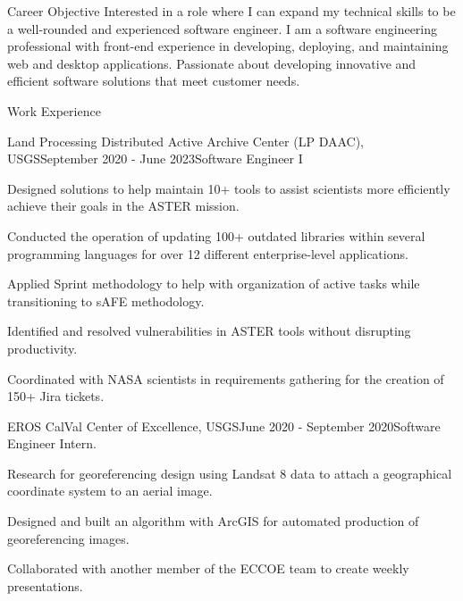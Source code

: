 \documentclass[11pt, a4paper]{resume}
\begin{document}
\begin{rSection}{Career Objective}
{\normalfont Interested in a role where I can expand my technical skills to be a well-rounded and experienced software engineer. I am a software engineering professional with front-end experience in developing, deploying, and maintaining web and desktop applications. Passionate about developing innovative and efficient software solutions that meet customer needs.}
\end{rSection}


\begin{rSection}{Work Experience}
\begin{rSubsection}{Land Processing Distributed Active Archive Center (LP DAAC), USGS}{\normalfont September 2020 - June 2023}{Software Engineer I}{}
 \item {\normalfont Designed solutions to help maintain 10+ tools to assist scientists more efficiently achieve their goals in the ASTER mission.}
  \item {\normalfont Conducted the operation of updating 100+ outdated libraries within several programming languages for over 12 different enterprise-level applications.}
 \item {\normalfont Applied Sprint methodology to help with organization of active tasks while transitioning to sAFE methodology.}
 \item {\normalfont Identified and resolved vulnerabilities in ASTER tools without disrupting productivity.}
 \item {\normalfont Coordinated with NASA scientists in requirements gathering for the creation of 150+ Jira tickets.}
\end{rSubsection}
\begin{rSubsection}{EROS CalVal Center of Excellence, USGS}{\normalfont June 2020 - September 2020}{Software Engineer Intern.}{}
 \item {\normalfont Research for georeferencing design using Landsat 8 data to attach a geographical coordinate system to an aerial image.}
 \item {\normalfont Designed and built an algorithm with ArcGIS for automated production of georeferencing images.}
  \item {\normalfont Collaborated with another member of the ECCOE team to create weekly presentations.}
\end{rSubsection}

\end{rSection}
\end{document}
